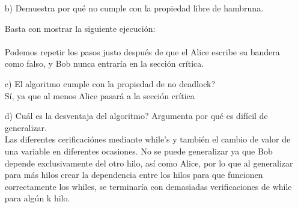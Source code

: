 \documentclass[12pt, letterpaper]{article}
\begin{document}
\begin{itemize}
\begin{itemize}
\begin{itemize}
\item[Caso 2.2] Bob no entra en el primer while\\
Entonces sabemos que no existe un escritura de flag[B] entre los dos eventos, siendo así, por transitividad de $\rightarrow$ entre 5) y 1) tenemos
$$8) write_B(flag[B] = true) \rightarrow read_A(flag[B] == false) $$
lo cual es una contradicción

\end{itemize}
Por lo tanto vemos que la suposición es incorrecta.\\
Por lo tanto si se resuelte el problema de la exlusión mutua.



\item[b) ]Demuestra por qu\'e no cumple con la propiedad libre de hambruna.

Basta con mostrar la siguiente ejecución:\\
\\
Podemos repetir los pasos justo después de que el Alice escribe su bandera como falso, y Bob nunca entraría en la sección crítica.

\item[c) ]El algoritmo cumple con la propiedad de no deadlock?\\
Sí, ya que al menos Alice pasará a la sección crítica
\item[d) ]Cu\'al es la desventaja del algoritmo? Argumenta por qu\'e es dif\'icil de
generalizar.\\
Las diferentes cerificaciónes mediante while's y también el cambio de valor de una variable en diferentes ocasiones. No se puede generalizar ya que Bob depende exclusivamente del otro hilo, así como Alice, por lo que al generalizar para más hilos crear la dependencia entre los hilos para que funcionen correctamente los whiles, se terminaría con demasiadas verificaciones de while para algún k hilo.


\end{itemize}
\end{itemize}
\end{document}
